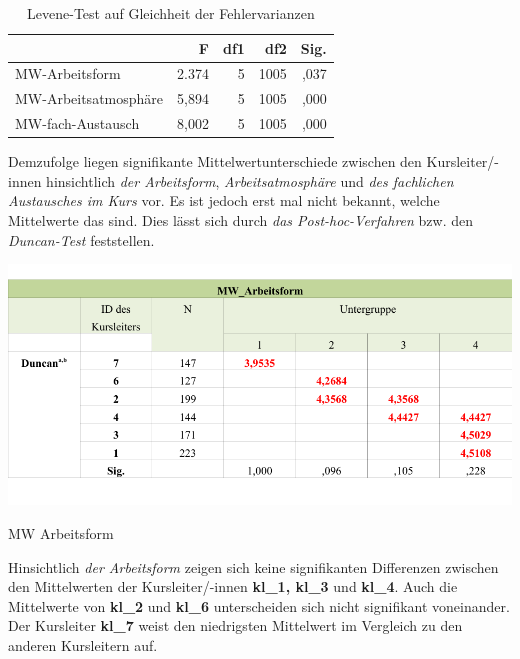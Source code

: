\documentclass[12pt,a4paper]{article}
\begin{document}


\begin{table}
\begin{center}
\begin{tabular}{|l|r|r|r|r|}
\hline 
 & F & df1 & df2 & Sig. \\ 
\hline 
MW-Arbeitsform & 2.374 & 5 & 1005 & ,037 \\ 
\hline 
MW-Arbeitsatmosphäre & 5,894 & 5 & 1005 & ,000 \\ 
\hline 
MW-fach-Austausch & 8,002 & 5 & 1005 & ,000 \\ 
\hline 
\end{tabular} 
\end{center}
\caption{Levene-Test auf Gleichheit der Fehlervarianzen}
\end{table}
\FloatBarrier

Demzufolge liegen signifikante Mittelwertunterschiede zwischen den Kurs\-lei\-ter/-in\-nen hinsichtlich \textit{der Arbeitsform}, \textit{Arbeitsatmosphäre} und \textit{des fachlichen Austausches im Kurs} vor. Es ist jedoch erst mal nicht bekannt, welche Mittelwerte das sind. Dies lässt sich durch  \textit{das Post-hoc-Verfahren} bzw. den \textit{Duncan-Test} feststellen.


\begin{table}[!ht]
\includegraphics[scale=0.85]{tab01.pdf}
\caption{MW Arbeitsform}
\label{tab.6}
\end{table}
\FloatBarrier

Hinsichtlich \textit{der Arbeitsform} zeigen sich keine signifikanten Differenzen zwischen den Mittelwerten der Kursleiter/-innen \textbf{kl\_1, kl\_3} und \textbf{kl\_4}. Auch die Mittelwerte von \textbf{kl\_2} und \textbf{kl\_6} unterscheiden sich nicht signifikant von\-ei\-nan\-der. Der Kursleiter \textbf{kl\_7} weist den niedrigsten Mittelwert im Vergleich zu den anderen Kursleitern auf. 
\end{document}
